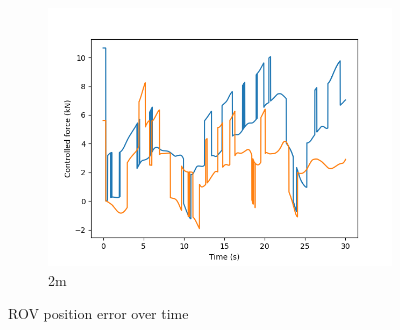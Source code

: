 \documentclass[class=article, crop=false]{standalone}
\begin{document}
\begin{figure}
\begin{subfigure}[b]{0.48\textwidth}
        \includegraphics{scenario1/rov-50m/2.0m/usv_forces}
        \caption{2m}
        \label{}
    \end{subfigure}

    \caption{ROV position error over time}
\end{figure}
\end{document}
